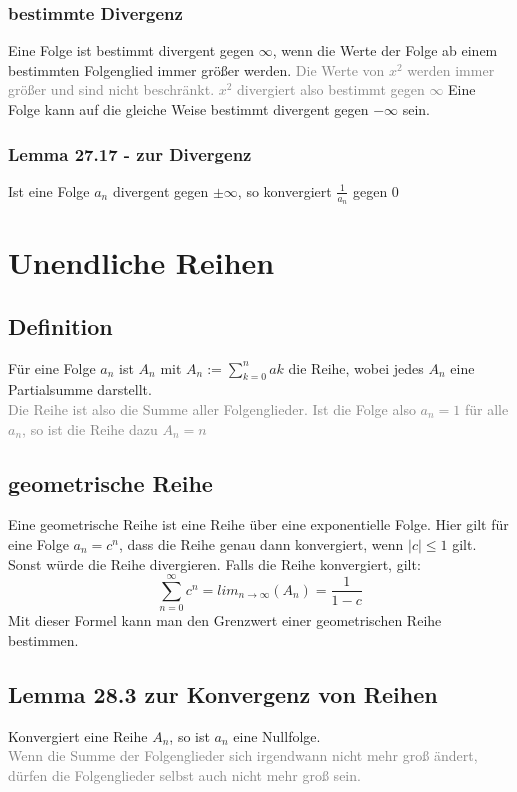 \documentclass{report}
\begin{document}
		\subsubsection{bestimmte Divergenz}
			Eine Folge ist bestimmt divergent gegen $\infty$, wenn die Werte der Folge ab einem bestimmten Folgenglied immer größer werden. \textcolor{gray}{Die Werte von $x^2$ werden immer größer und sind nicht beschränkt. $x^2$ divergiert also bestimmt gegen $\infty$}
			Eine Folge kann auf die gleiche Weise bestimmt divergent gegen $-\infty$ sein.
		\subsubsection{Lemma 27.17 - zur Divergenz}
			Ist eine Folge $a_n$ divergent gegen $\pm \infty$, so konvergiert $\frac1{a_n}$ gegen 0\\
	\section{Unendliche Reihen}
		\subsection{Definition}
		Für eine Folge $a_n$ ist $A_n$ mit $A_n := \sum_{k=0}^n ak$ die Reihe, wobei jedes $A_n$ eine Partialsumme darstellt.\\
		\textcolor{gray}{Die Reihe ist also die Summe aller Folgenglieder. Ist die Folge also $a_n = 1$ für alle $a_n$, so ist die Reihe dazu $A_n = n$}
		\subsection{geometrische Reihe}	
		Eine geometrische Reihe ist eine Reihe über eine exponentielle Folge. Hier gilt für eine Folge $a_n = c^n$, dass die Reihe genau dann konvergiert, wenn $|c| \leq 1$ gilt. Sonst würde die Reihe divergieren.
		Falls die Reihe konvergiert, gilt:\\
		\begin{equation}
			\displaystyle\sum_{n=0}^{\infty} c^n = lim_{n\to\infty}(A_n) = \frac1{1-c}
		\end{equation}
		Mit dieser Formel kann man den Grenzwert einer geometrischen Reihe bestimmen.
		\subsection{Lemma 28.3 zur Konvergenz von Reihen}
		Konvergiert eine Reihe $A_n$, so ist $a_n$ eine Nullfolge.\\
		\textcolor{gray}{Wenn die Summe der Folgenglieder sich irgendwann nicht mehr groß ändert, dürfen die Folgenglieder selbst auch nicht mehr groß sein.}
\end{document}
